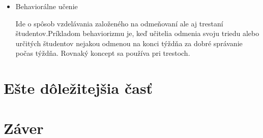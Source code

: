 \documentclass[10pt,twoside,slovak,a4paper]{article}
\begin{document}
\begin{itemize}
    \item Behaviorálne učenie

Ide o spôsob vzdelávania založeného na odmeňovaní ale aj trestaní študentov.Príkladom behaviorizmu je, keď učitelia odmenia svoju triedu alebo určitých študentov nejakou odmenou na konci týždňa za dobré správanie počas týždňa. Rovnaký koncept sa používa pri trestoch.
\end{itemize}
\section{Ešte dôležitejšia časť} \label{dolezitejsia}




\section{Záver} \label{zaver} %






\end{document}
